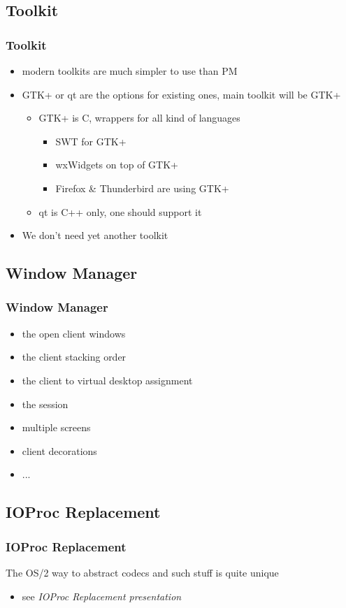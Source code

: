 \documentclass{beamer}
\begin{document}
\subsection{Toolkit}
\begin{frame}
\frametitle{Toolkit}
\begin{itemize}
  \item modern toolkits are much simpler to use than PM
  \item GTK+ or qt are the options for existing ones, main toolkit will be GTK+
  \begin{itemize}
    \item GTK+ is C, wrappers for all kind of languages
    \begin{itemize}
      \item SWT for GTK+
      \item wxWidgets on top of GTK+
      \item Firefox \& Thunderbird are using GTK+
    \end{itemize}
    \item qt is C++ only, one should support it
  \end{itemize}
  \item We don't need yet another toolkit \texttrademark
\end{itemize}
\end{frame}

\subsection{Window Manager}
\begin{frame}
\frametitle{Window Manager}
\begin{itemize}
  \item the open client windows
  \item the client stacking order
  \item the client to virtual desktop assignment
  \item the session
  \item multiple screens
  \item client decorations
  \item ...
\end{itemize}
\end{frame}

\subsection{IOProc Replacement}
\begin{frame}
\frametitle{IOProc Replacement}
The OS/2 way to abstract codecs and such stuff is quite unique
\begin{itemize}
  \item see \it{IOProc Replacement} presentation
\end{itemize}
\end{frame}
\end{document}
